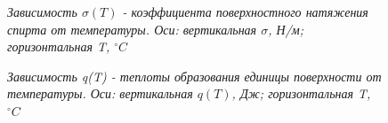 \documentclass[a4paper, fontsize = 14pt]{article}
\begin{document}
\begin{figure}[hbt]\label{risI}
\caption{\textit{Зависимость $\sigma(T)$ - коэффициента поверхностного натяжения спирта от температуры. Оси: вертикальная $\sigma$, Н/м; горизонтальная T, $^{\circ}C$}}
\end{figure}

\begin{figure}[hbt]
\caption{\textit{Зависимость q(T) - теплоты образования единицы поверхности от температуры. Оси: вертикальная $q(T)$, Дж; горизонтальная T, $^{\circ}C$}}
\end{figure}
\end{document}
